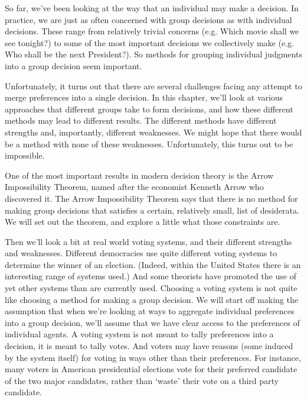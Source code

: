 
\def\mytitle{Voting Theory}
\def\myauthor{Brian Weatherson, Philosophy 444}
\def\mydate{February 20-22, 2018}


\begin{multicols}{2}
\noindent So far, we've been looking at the way that an individual may make a decision. In practice, we are just as often concerned with group decisions as with individual decisions. These range from relatively trivial concerns (e.g. Which movie shall we see tonight?) to some of the most important decisions we collectively make (e.g. Who shall be the next President?). So methods for grouping individual judgments into a group decision seem important.

Unfortunately, it turns out that there are several challenges facing any attempt to merge preferences into a single decision. In this chapter, we'll look at various approaches that different groups take to form decisions, and how these different methods may lead to different results. The different methods have different strengths and, importantly, different weaknesses. We might hope that there would be a method with none of these weaknesses. Unfortunately, this turns out to be impossible. 

One of the most important results in modern decision theory is the Arrow Impossibility Theorem, named after the economist Kenneth Arrow who discovered it. The Arrow Impossibility Theorem says that there is no method for making group decisions that satisfies a certain, relatively small, list of desiderata. We will set out the theorem, and explore a little what those constraints are.

Then we'll look a bit at real world voting systems, and their different strengths and weaknesses. Different democracies use quite different voting systems to determine the winner of an election. (Indeed, within the United States there is an interesting range of systems used.) And some theorists have promoted the use of yet other systems than are currently used. Choosing a voting system is not quite like choosing a method for making a group decision. We will start off making the assumption that when we're looking at ways to aggregate individual preferences into a group decision, we'll assume that we have clear access to the preferences of individual agents. A voting system is not meant to tally preferences into a decision, it is meant to tally votes. And voters may have reasons (some induced by the system itself) for voting in ways other than their preferences. For instance, many voters in American presidential elections vote for their preferred candidate of the two major candidates, rather than `waste' their vote on a third party candidate.


\end{multicols}
